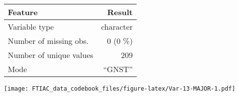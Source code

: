 \documentclass[]{article}
\newcommand{\bminione}{\begin{minipage}{0.75 \textwidth}}
\newcommand{\bminitwo}{\begin{minipage}{0.25 \textwidth}}
\newcommand{\emini}{\end{minipage}}
\begin{document}
\bminione

\begin{longtable}[]{@{}lr@{}}
\toprule
\begin{minipage}[b]{0.34\columnwidth}\raggedright\strut
Feature\strut
\end{minipage} & \begin{minipage}[b]{0.14\columnwidth}\raggedleft\strut
Result\strut
\end{minipage}\tabularnewline
\midrule
\endhead
\begin{minipage}[t]{0.34\columnwidth}\raggedright\strut
Variable type\strut
\end{minipage} & \begin{minipage}[t]{0.14\columnwidth}\raggedleft\strut
character\strut
\end{minipage}\tabularnewline
\begin{minipage}[t]{0.34\columnwidth}\raggedright\strut
Number of missing obs.\strut
\end{minipage} & \begin{minipage}[t]{0.14\columnwidth}\raggedleft\strut
0 (0 \%)\strut
\end{minipage}\tabularnewline
\begin{minipage}[t]{0.34\columnwidth}\raggedright\strut
Number of unique values\strut
\end{minipage} & \begin{minipage}[t]{0.14\columnwidth}\raggedleft\strut
209\strut
\end{minipage}\tabularnewline
\begin{minipage}[t]{0.34\columnwidth}\raggedright\strut
Mode\strut
\end{minipage} & \begin{minipage}[t]{0.14\columnwidth}\raggedleft\strut
``GNST''\strut
\end{minipage}\tabularnewline
\bottomrule
\end{longtable}

\emini
\bminitwo
\texttt{[image: FTIAC\_data\_codebook\_files/figure-latex/Var-13-MAJOR-1.pdf]}
\emini
\end{document}
